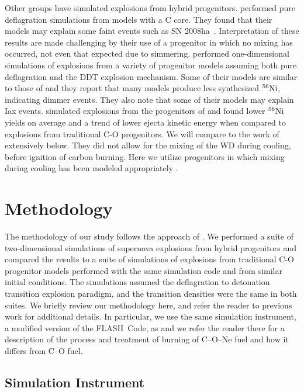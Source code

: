 \documentclass[preprint2]{aastex63}
\newcommand{\Ni}[1]{\ensuremath{{}^{#1}{\rm Ni}}}
\newcommand{\code}[1]{\textsc{#1}}
\newcommand{\FLASH}{\code{FLASH}}
\begin{document}
Other groups have simulated explosions from hybrid progenitors.
\citet{kromeretal2015} performed pure deflagration simulations from models
with a C core. They found that their models may explain some faint events
such as SN 2008ha~\citep{foleyetal2009}.
Interpretation of these results are made challenging by their use of a progenitor in which no mixing has occurred, not even that expected due to simmering.
\citet{bravoetal2016} performed one-dimensional simulations of explosions from
a variety of progenitor models assuming both pure deflagration and the DDT
explosion mechanism.
Some of their models are similar to those of \citep{denissenkovetal2015} and
they report that many models produce less synthesized
\Ni{56}, indicating dimmer events. They also note that some of their
models may explain Iax events.
\citet{willcoxetal2016} simulated explosions from the progenitors of
\citet{denissenkovetal2015} and found lower
\Ni{56} yields on average and a trend of lower ejecta kinetic energy
when compared to explosions from traditional C-O progenitors.
We will compare to the work of \citet{willcoxetal2016} extensively below.
They did not allow for the mixing of the WD during cooling, before ignition of carbon burning.
Here we utilize progenitors in which mixing during cooling has been modeled appropriately \citep{brooksetal2017}.


\section{Methodology}
\label{sec:method}

The methodology of our study follows the approach of \citet{willcoxetal2016}.
We performed a suite of two-dimensional simulations of supernova explosions
from hybrid progenitors and compared the results to a suite of simulations
of explosions from traditional C-O progenitor models performed with the
same simulation code and from similar initial conditions. The simulations assumed
the deflagration to detonation transition explosion paradigm, and the
transition densities were the same in both suites. We briefly review our methodology
here, and refer the reader to previous work for additional details.
In particular, we use the same simulation instrument, a modified version
of the \FLASH\ Code, as \citet{willcoxetal2016} and we refer the reader there
for a description of the process and treatment of burning of C--O--Ne fuel and how it differs from C--O fuel.

\subsection{Simulation Instrument}
\end{document}
